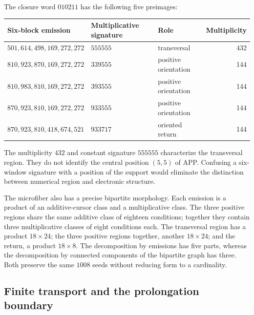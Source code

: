 The closure word \(010211\) has the following five preimages:
\begin{center}\small
\begin{tabular}{@{}lll r@{}}\toprule
Six-block emission&Multiplicative signature&Role&Multiplicity\\\midrule
\(501,614,498,169,272,272\)&\(555555\)&transversal&432\\
\(810,923,870,169,272,272\)&\(339555\)&positive orientation&144\\
\(810,983,810,169,272,272\)&\(393555\)&positive orientation&144\\
\(870,923,810,169,272,272\)&\(933555\)&positive orientation&144\\
\(870,923,810,418,674,521\)&\(933717\)&oriented return&144\\\bottomrule
\end{tabular}
\end{center}
The multiplicity \(432\) and constant signature \(555555\) characterize the transversal region. They do not identify the central position \((5,5)\) of APP. Confusing a six-window signature with a position of the support would eliminate the distinction between numerical region and electronic structure.

The microfiber also has a precise bipartite morphology. Each emission is a product of an additive-cursor class and a multiplicative class. The three positive regions share the same additive class of eighteen conditions; together they contain three multiplicative classes of eight conditions each. The transversal region has a product \(18\times24\); the three positive regions together, another \(18\times24\); and the return, a product \(18\times8\). The decomposition by emissions has five parts, whereas the decomposition by connected components of the bipartite graph has three. Both preserve the same \(1008\) seeds without reducing form to a cardinality.

\subsection{Finite transport and the prolongation boundary}

